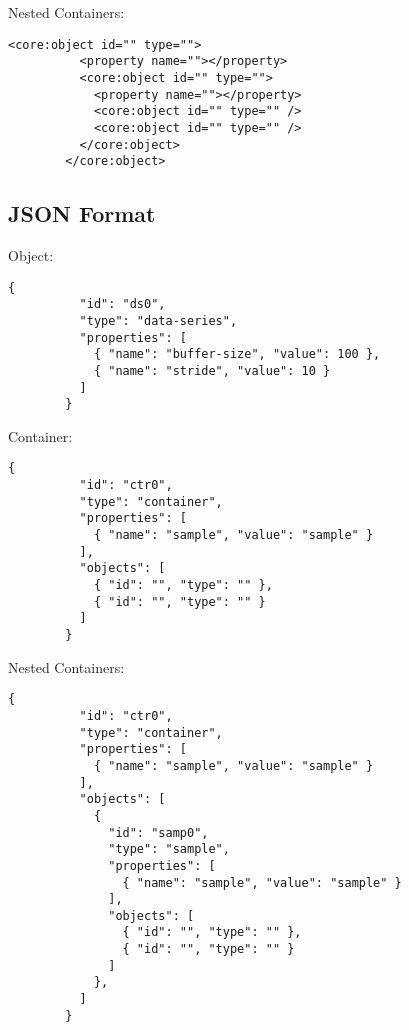 \documentclass[11pt]{article}
\begin{document}
      Nested Containers:

      \begin{lstlisting}[caption={Nested Container Configuration in XML},label={lst:cfg-xml-ctr}]
        <core:object id="" type="">
          <property name=""></property>
          <core:object id="" type="">
            <property name=""></property>
            <core:object id="" type="" />
            <core:object id="" type="" />
          </core:object>
        </core:object>
      \end{lstlisting}

    \subsection{JSON Format}\label{sec:cfg-json}

      Object:

      \begin{lstlisting}[caption={Object Configuration in JSON},label={lst:cfg-json-obj}]
        {
          "id": "ds0",
          "type": "data-series",
          "properties": [
            { "name": "buffer-size", "value": 100 },
            { "name": "stride", "value": 10 }
          ]
        }
      \end{lstlisting}

      Container:

      \begin{lstlisting}[caption={Container Configuration in JSON},label={lst:cfg-json-ctr}]
        {
          "id": "ctr0",
          "type": "container",
          "properties": [
            { "name": "sample", "value": "sample" }
          ],
          "objects": [
            { "id": "", "type": "" },
            { "id": "", "type": "" }
          ]
        }
      \end{lstlisting}

      Nested Containers:

      \begin{lstlisting}[caption={Nested Container Configuration in JSON},label={lst:cfg-json-ctr}]
        {
          "id": "ctr0",
          "type": "container",
          "properties": [
            { "name": "sample", "value": "sample" }
          ],
          "objects": [
            {
              "id": "samp0",
              "type": "sample",
              "properties": [
                { "name": "sample", "value": "sample" }
              ],
              "objects": [
                { "id": "", "type": "" },
                { "id": "", "type": "" }
              ]
            },
          ]
        }
      \end{lstlisting}
\end{document}
